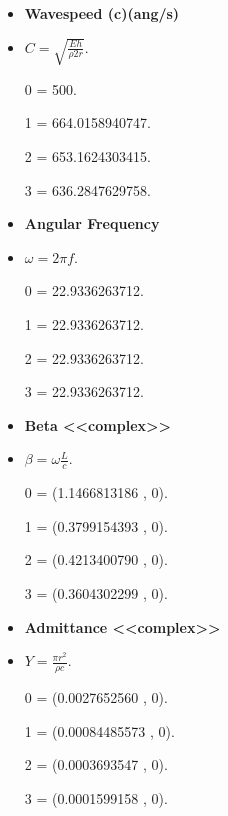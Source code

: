 \documentclass[10pt]{beamer}
\theoremstyle{remark}
\theoremstyle{definition}
\begin{document}
\begin{frame}[allowframebreaks]
\begin{itemize}
\end{itemize}

\framebreak

\begin{itemize}
\item \textbf{Wavespeed (c)(ang/s)}
\item $ C = \sqrt{\frac{Eh}{\rho 2 r}}$.
\item [0] = 500.
\item [1] = 664.0158940747.
\item [2] = 653.1624303415.
\item [3] = 636.2847629758.

\end{itemize}

\framebreak

\begin{itemize}
\item \textbf{Angular Frequency}
\item $ \omega = 2 \pi f$.
\item [0] = 22.9336263712.
\item [1] = 22.9336263712.
\item [2] = 22.9336263712.
\item [3] = 22.9336263712.

\end{itemize}

\framebreak

\begin{itemize}
\item \textbf{Beta <<complex>>}
\item $ \beta = \omega \frac{L}{c}$.
\item [0] = (1.1466813186  ,  0).
\item [1] = (0.3799154393  ,  0).
\item [2] = (0.4213400790  ,  0).
\item [3] = (0.3604302299  ,  0).

\end{itemize}

\framebreak

\begin{itemize}
\item \textbf{Admittance <<complex>>}
\item $ Y = \frac{\pi r^2}{\rho c}$.
\item [0] = (0.0027652560  ,  0).
\item [1] = (0.00084485573 ,  0).
\item [2] = (0.0003693547  ,  0).
\item [3] = (0.0001599158  ,  0).


\end{itemize}
\end{frame}
\end{document}
